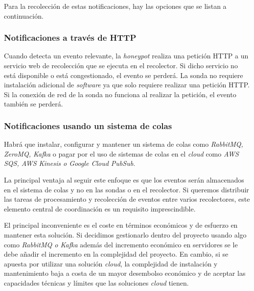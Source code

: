 Para la recolección de estas notificaciones, hay las opciones que se listan a continuación.

\subsubsection{Notificaciones a través de HTTP}

Cuando detecta un evento relevante, la \emph{honeypot} realiza una petición HTTP a un servicio web de recolección que se ejecuta en el recolector.
Si dicho servicio no está disponible o está congestionado, el evento se perderá.
La sonda no requiere instalación adicional de \emph{software} ya que solo requiere realizar una petición HTTP. 
Si la conexión de red de la sonda no funciona al realizar la petición, el evento también se perderá.

\subsubsection{Notificaciones usando un sistema de colas}

Habrá que instalar, configurar y mantener un sistema de colas como \emph{RabbitMQ, ZeroMQ, Kafka} 
o pagar por el uso de sistemas de colas en el \emph{cloud} como \emph{AWS SQS, AWS Kinesis o Google Cloud PubSub}.

La principal ventaja al seguir este enfoque es que los eventos serán almacenados en el sistema de colas y no en las sondas o en el recolector. Si queremos
distribuir las tareas de procesamiento y recolección de eventos entre varios recolectores, este elemento central de coordinación es un requisito imprescindible.

El principal inconveniente es el coste en términos económicos y de esfuerzo en mantener esta solución. 
Si decidimos gestionarlo dentro del proyecto usando algo como \emph{RabbitMQ o Kafka} además del incremento económico en servidores 
se le debe añadir el incremento en la complejidad del proyecto. En cambio, si se apuesta por utilizar una solución \emph{cloud}, la complejidad
de instalación y mantenimiento baja a costa de un mayor desembolso económico y de aceptar las capacidades técnicas y límites que las soluciones 
\emph{cloud} tienen.

